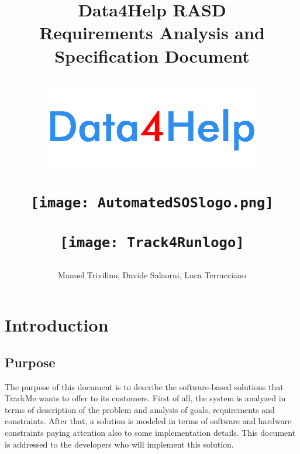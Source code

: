 \documentclass[a4paper]{article}
\begin{document}
\author{Manuel Trivilino, Davide Salaorni, Luca Terracciano}

\title{\Large \textbf{Data4Help RASD}\\
\textbf{Requirements Analysis and \\Specification Document}
    \begin{figure}[h]
        \centering
        \includegraphics[width=270pt]{data4helpblu}
        \label{fig:my_label}
    \end{figure}
    \vspace{-2.4cm}
    \begin{figure}[h]
        \centering
        \texttt{[image: AutomatedSOSlogo.png]}
        \label{fig:my_label}
    \end{figure}
    \vspace{-2cm}
    \begin{figure}[h]
        \centering
        \texttt{[image: Track4Runlogo]}
        \label{fig:my_label}
\end{figure}
}

\maketitle
\newpage

\tableofcontents
\newpage

\section{Introduction}

\subsection{Purpose}
The purpose of this document is to describe the software-based solutions that TrackMe wants to offer to its customers. First of all, the system is analyzed in terms of description of the problem and analysis of goals, requirements and constraints. After that, a solution is modeled in terms of software and hardware constraints paying attention also to some implementation details. This document is addressed to the developers who will implement this solution.
\end{document}
